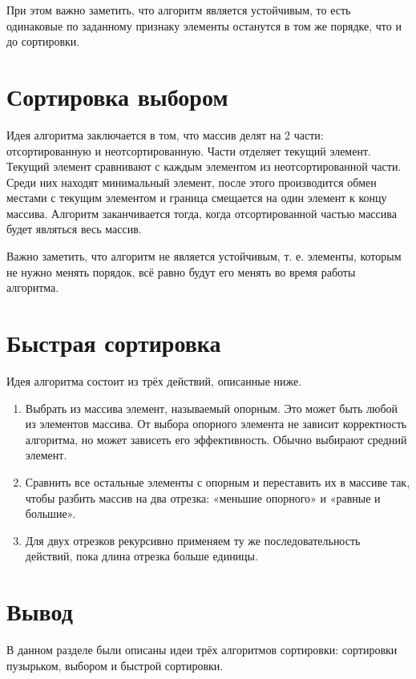 \documentclass[12pt]{report}
\begin{document}
При этом важно заметить, что алгоритм является устойчивым, то есть одинаковые по заданному признаку элементы останутся в том же порядке, что и до сортировки.

\section{Сортировка выбором}

Идея алгоритма заключается в том, что массив делят на 2 части: отсортированную и неотсортированную. Части отделяет текущий элемент. Текущий элемент сравнивают с каждым элементом из неотсортированной части. Среди них находят минимальный элемент, после этого производится обмен местами с текущим элементом и граница смещается на один элемент к концу массива. Алгоритм заканчивается тогда, когда отсортированной частью массива будет являться весь массив. 

Важно заметить, что алгоритм не является устойчивым, т. е. элементы, которым не нужно менять порядок, всё равно будут его менять во время работы алгоритма.

\section{Быстрая сортировка}

Идея алгоритма состоит из трёх действий, описанные ниже.

\begin{enumerate}
	\item Выбрать из массива элемент, называемый опорным. Это может быть любой из элементов массива. От выбора опорного элемента не зависит корректность алгоритма, но может зависеть его эффективность. Обычно выбирают средний элемент.
	\item Сравнить все остальные элементы с опорным и переставить их в массиве так, чтобы разбить массив на два отрезка: «меньшие опорного» и «равные и большие».
	\item Для двух отрезков рекурсивно применяем ту же последовательность действий, пока длина отрезка больше единицы.
\end{enumerate}

\section{Вывод}

В данном разделе были описаны идеи трёх алгоритмов сортировки: сортировки пузырьком, выбором и быстрой сортировки.
	
\end{document}
